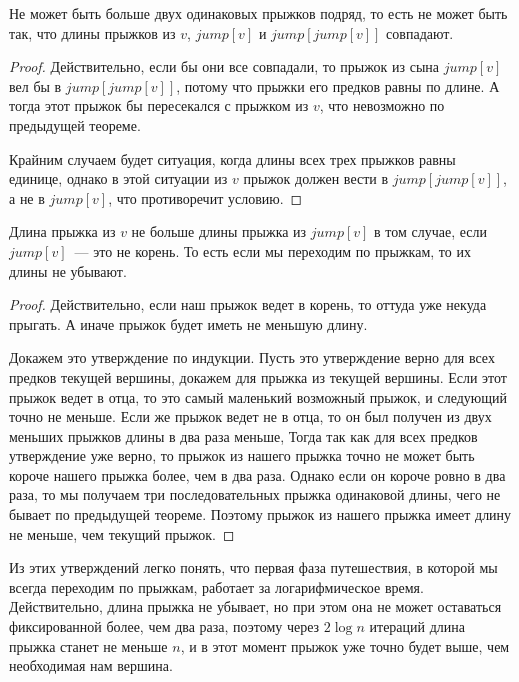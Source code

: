 \begin{theorem}
    Не может быть больше двух одинаковых прыжков подряд, то есть не может быть так, что длины прыжков из $v$, $jump[v]$ и $jump[jump[v]]$ совпадают.
\end{theorem}

\begin{proof}
    Действительно, если бы они все совпадали, то прыжок из сына $jump[v]$ вел бы в $jump[jump[v]]$, потому что прыжки его предков равны по длине. А тогда этот прыжок бы пересекался с прыжком из $v$, что невозможно по предыдущей теореме.

    Крайним случаем будет ситуация, когда длины всех трех прыжков равны единице, однако в этой ситуации из $v$ прыжок должен вести в $jump[jump[v]]$, а не в $jump[v]$, что противоречит условию.
\end{proof}

\begin{theorem}
    Длина прыжка из $v$ не больше длины прыжка из $jump[v]$ в том случае, если $jump[v]$~--- это не корень. То есть если мы переходим по прыжкам, то их длины не убывают.
\end{theorem}

\begin{proof}
    Действительно, если наш прыжок ведет в корень, то оттуда уже некуда прыгать. А иначе прыжок будет иметь не меньшую длину.

    Докажем это утверждение по индукции. Пусть это утверждение верно для всех предков текущей вершины, докажем для прыжка из текущей вершины.
    Если этот прыжок ведет в отца, то это самый маленький возможный прыжок, и следующий точно не меньше.
    Если же прыжок ведет не в отца, то он был получен из двух меньших прыжков длины в два раза меньше, Тогда так как для всех предков утверждение уже верно, то прыжок из нашего прыжка точно не может быть короче нашего прыжка более, чем в два раза. Однако если он короче ровно в два раза, то мы получаем три последовательных прыжка одинаковой длины, чего не бывает по предыдущей теореме. Поэтому прыжок из нашего прыжка имеет длину не меньше, чем текущий прыжок.
\end{proof}

Из этих утверждений легко понять, что первая фаза путешествия, в которой мы всегда переходим по прыжкам, работает за логарифмическое время. Действительно, длина прыжка не убывает, но при этом она не может оставаться фиксированной более, чем два раза, поэтому через $2 \log n$ итераций длина прыжка станет не меньше $n$, и в этот момент прыжок уже точно будет выше, чем необходимая нам вершина.

